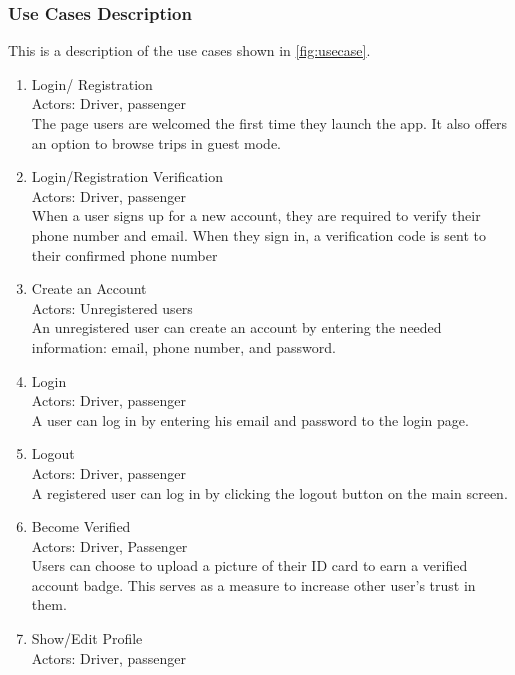 \documentclass[a4paper, 12pt]{report} %
\begin{document}
        \subsubsection{Use Cases Description}
            This is a description of the use cases shown in \ref{fig:usecase}.
            \begin{enumerate}
                \item Login/ Registration \\
                    Actors: Driver, passenger \\
                    The page users are welcomed the first time they launch the app. It also offers an option to browse trips in guest mode.
                \item Login/Registration Verification\\            
                    Actors: Driver, passenger\\
                    When a user signs up for a new account, they are required to verify their phone number and email. When they sign in, a verification code is sent to their confirmed phone number
                \item Create an Account \\
                    Actors: Unregistered users\\
                    An unregistered user can create an account by entering the needed information: email, phone number, and password.
                \item Login \\
                    Actors: Driver, passenger\\
                    A user can log in by entering his email and password to the login page.
                \item Logout\\
                    Actors: Driver, passenger\\
                    A registered user can log in by clicking the logout button on the main screen.
                \item Become Verified \\
                    Actors: Driver, Passenger\\                
                    Users can choose to upload a picture of their ID card to earn a verified account badge. This serves as a measure to increase other user's trust in them. 
                \item Show/Edit Profile \\
                    Actors: Driver, passenger \\

\end{enumerate}
\end{document}

